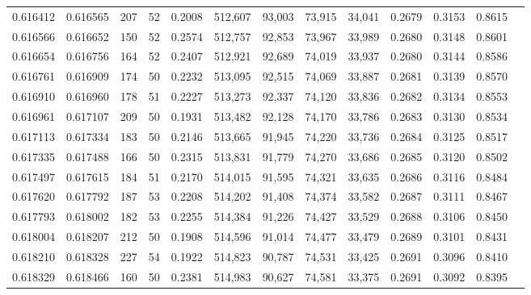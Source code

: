 \begin{tabular}{rrrrrrrrrrrrr}
0.616412 & 0.616565 &   207 &  52 &                                     0.2008 & 512,607 &  93,003 &  73,915 &  34,041 & 0.2679 & 0.3153 & 0.8615 \\
0.616566 & 0.616652 &   150 &  52 &                                     0.2574 & 512,757 &  92,853 &  73,967 &  33,989 & 0.2680 & 0.3148 & 0.8601 \\
0.616654 & 0.616756 &   164 &  52 &                                     0.2407 & 512,921 &  92,689 &  74,019 &  33,937 & 0.2680 & 0.3144 & 0.8586 \\
0.616761 & 0.616909 &   174 &  50 &                                     0.2232 & 513,095 &  92,515 &  74,069 &  33,887 & 0.2681 & 0.3139 & 0.8570 \\
0.616910 & 0.616960 &   178 &  51 &                                     0.2227 & 513,273 &  92,337 &  74,120 &  33,836 & 0.2682 & 0.3134 & 0.8553 \\
0.616961 & 0.617107 &   209 &  50 &                                     0.1931 & 513,482 &  92,128 &  74,170 &  33,786 & 0.2683 & 0.3130 & 0.8534 \\
0.617113 & 0.617334 &   183 &  50 &                                     0.2146 & 513,665 &  91,945 &  74,220 &  33,736 & 0.2684 & 0.3125 & 0.8517 \\
0.617335 & 0.617488 &   166 &  50 &                                     0.2315 & 513,831 &  91,779 &  74,270 &  33,686 & 0.2685 & 0.3120 & 0.8502 \\
0.617497 & 0.617615 &   184 &  51 &                                     0.2170 & 514,015 &  91,595 &  74,321 &  33,635 & 0.2686 & 0.3116 & 0.8484 \\
0.617620 & 0.617792 &   187 &  53 &                                     0.2208 & 514,202 &  91,408 &  74,374 &  33,582 & 0.2687 & 0.3111 & 0.8467 \\
0.617793 & 0.618002 &   182 &  53 &                                     0.2255 & 514,384 &  91,226 &  74,427 &  33,529 & 0.2688 & 0.3106 & 0.8450 \\
0.618004 & 0.618207 &   212 &  50 &                                     0.1908 & 514,596 &  91,014 &  74,477 &  33,479 & 0.2689 & 0.3101 & 0.8431 \\
0.618210 & 0.618328 &   227 &  54 &                                     0.1922 & 514,823 &  90,787 &  74,531 &  33,425 & 0.2691 & 0.3096 & 0.8410 \\
0.618329 & 0.618466 &   160 &  50 &                                     0.2381 & 514,983 &  90,627 &  74,581 &  33,375 & 0.2691 & 0.3092 & 0.8395 \\

\end{tabular}
